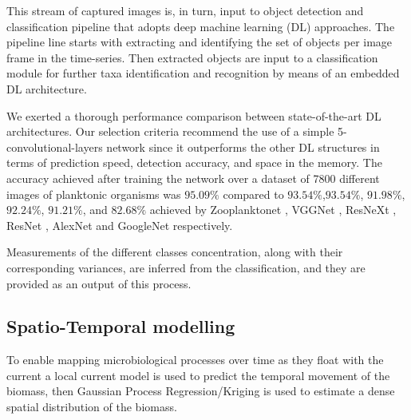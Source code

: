 \documentclass[conference]{IEEEtran}
\begin{document}
This stream of captured images is, in turn, input to object detection
and classification pipeline that adopts deep machine learning (DL)
approaches. The pipeline line starts with extracting and identifying
the set of objects per image frame in the time-series. Then extracted
objects are input to a classification module for further taxa
identification and recognition by means of an embedded DL
architecture.

We exerted a thorough performance comparison between state-of-the-art
DL architectures. Our selection criteria recommend the use of a simple
5-convolutional-layers network since it outperforms the other DL
structures in terms of prediction speed, detection accuracy, and space
in the memory. The accuracy achieved after training the network over a
dataset of 7800 different images of planktonic organisms was $95.09\%$
compared to $93.54\%$,$93.54\%$, $91.98\%$, $92.24\%$, $91.21\%$, and
$82.68\%$ achieved by Zooplanktonet \cite{dai2016zooplanktonet},
VGGNet \cite{simonyan2014very}, ResNeXt \cite{xie2017aggregated},
ResNet \cite{he2016deep}, AlexNet \cite{krizhevsky2012imagenet} and
GoogleNet \cite{szegedy2015going} respectively.

Measurements of the different classes
concentration, along with their corresponding variances, are inferred from the classification,
and they are provided as an output of this process.

\subsection{Spatio-Temporal modelling}
To enable mapping microbiological processes over time as they float
with the current a local current model is used to predict the temporal
movement of the biomass, then Gaussian Process Regression/Kriging is
used to estimate a dense spatial distribution of the biomass.
\end{document}
